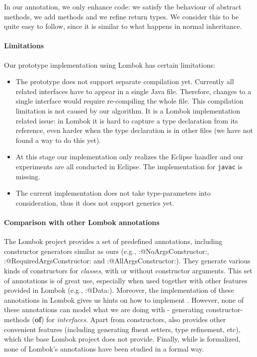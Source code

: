 \begin{itemize}
In our annotation, we only enhance code:
we satisfy the behaviour of abstract methods, we add methods and we refine return types.
We consider this to be quite easy to follow, since it is similar to what happens in normal inheritance.

\end{itemize}

\paragraph{Limitations}
Our prototype implementation using Lombok has certain limitations:
\begin{itemize}
\item The prototype does not support separate compilation yet. Currently all
  related interfaces have to appear in a single Java file. Therefore, changes to
  a single interface would require re-compiling the whole file. This compilation
  limitation is not caused by our algorithm. It is a Lombok implementation related
  issue: in Lombok it is hard to capture a type declaration from its reference,
  even harder when the type declaration is in other files (we have not found a
  way to do this yet).
\item At this stage our implementation only realizes the Eclipse handler and our
  experiments are all conducted in Eclipse. The implementation for
  \texttt{javac} is missing.
\item The current implementation does not take type-parameters into
  consideration, thus it does not support generics yet.
\end{itemize}

\paragraph{Comparison with other Lombok annotations}
The Lombok project provides a set of predefined annotations, including constructor
generators similar as ours (e.g., \Q:@NoArgsConstructor:,
\Q:@RequiredArgsConstructor: and \Q:@AllArgsConstructor:). They
generate various kinds of constructors for \emph{classes}, with or without
constructor arguments. This set of annotations is of great use, especially when
used together with other features provided in Lombok (e.g.,
\Q:@Data:). Moreover, the implementation of these annotations in Lombok
gives us hints on how to implement \mixin. However, none of these annotations
can model what we are doing with \mixin - generating constructor-methods
(\textbf{of}) for \emph{interfaces}. Apart from constructors, \mixin also
provides other convenient features (including generating fluent setters, type
refinement, etc), which the base Lombok project does not provide.
Finally, while \mixin is formalized, none of Lombok's annotations have been
studied in a formal way.

